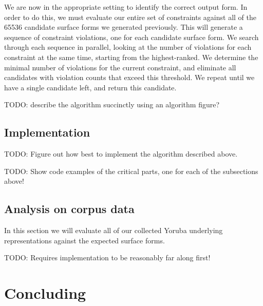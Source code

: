 \documentclass[12pt]{article}
\begin{document}
We are now in the appropriate setting to identify the correct output form. In
order to do this, we must evaluate our entire set of constraints against all of
the 65536 candidate surface forms we generated previously. This will generate a
sequence of constraint violations, one for each candidate surface form. We
search through each sequence in parallel, looking at the number of violations
for each constraint at the same time, starting from the highest-ranked. We
determine the minimal number of violations for the current constraint, and
eliminate all candidates with violation counts that exceed this threshold. We
repeat until we have a single candidate left, and return this candidate.

TODO: describe the algorithm succinctly using an algorithm figure?

\subsection{Implementation}

TODO: Figure out how best to implement the algorithm described above.

TODO: Show code examples of the critical parts, one for each of the
subsections above!

\subsection{Analysis on corpus data}

In this section we will evaluate all of our collected Yoruba underlying
representations against the expected surface forms.

TODO: Requires implementation to be reasonably far along first!

\section{Concluding}

\printbibliography
\end{document}
